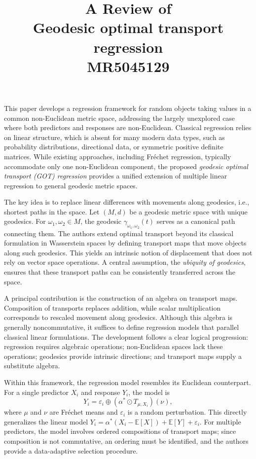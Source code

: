 \documentclass[11pt]{article}
\title{A Review of \\Geodesic optimal transport regression\\ MR5045129}
\begin{document}
	\maketitle	

	
	\noindent
	This paper develops a regression framework for random objects taking values in a common non-Euclidean metric space, addressing the largely unexplored case where both predictors and responses are non-Euclidean. Classical regression relies on linear structure, which is absent for many modern data types, such as probability distributions, directional data, or symmetric positive definite matrices. While existing approaches, including Fréchet regression, typically accommodate only one non-Euclidean component, the proposed \emph{geodesic optimal transport (GOT) regression} provides a unified extension of multiple linear regression to general geodesic metric spaces.
	
	The key idea is to replace linear differences with movements along geodesics, i.e., shortest paths in the space. Let $(M,d)$ be a geodesic metric space with unique geodesics. For $\omega_1,\omega_2 \in M$, the geodesic $\gamma_{\omega_1,\omega_2}(t)$ serves as a canonical path connecting them. The authors extend optimal transport beyond its classical formulation in Wasserstein spaces by defining transport maps that move objects along such geodesics. This yields an intrinsic notion of displacement that does not rely on vector space operations. A central assumption, the \emph{ubiquity of geodesics}, ensures that these transport paths can be consistently transferred across the space.
	
	A principal contribution is the construction of an algebra on transport maps. Composition of transports replaces addition, while scalar multiplication corresponds to rescaled movement along geodesics. Although this algebra is generally noncommutative, it suffices to define regression models that parallel classical linear formulations. The development follows a clear logical progression: regression requires algebraic operations; non-Euclidean spaces lack these operations; geodesics provide intrinsic directions; and transport maps supply a substitute algebra.
	
	Within this framework, the regression model resembles its Euclidean counterpart. For a single predictor $X_i$ and response $Y_i$, the model is
	\[
	Y_i = \varepsilon_i \oplus (\alpha^{*} \odot T_{\mu,X_i})(\nu),
	\]
	where $\mu$ and $\nu$ are Fréchet means and $\varepsilon_i$ is a random perturbation. This directly generalizes the linear model $Y_i = \alpha^{*}(X_i - \mathbb{E}[X]) + \mathbb{E}[Y] + \varepsilon_i$. For multiple predictors, the model involves ordered compositions of transport maps; since composition is not commutative, an ordering must be identified, and the authors provide a data-adaptive selection procedure.
	
\end{document}
